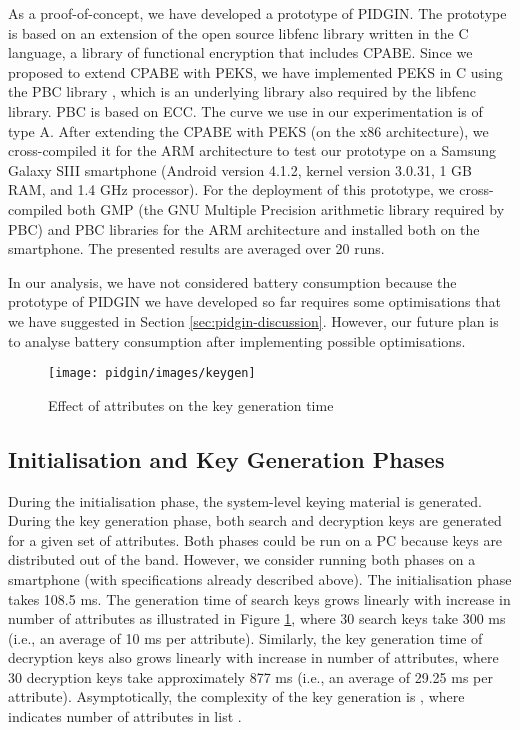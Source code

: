 \documentclass[epsfig,a4paper,11pt,titlepage]{book}
\numberwithin{algorithm}{chapter}
\begin{document}
As a proof-of-concept, we have developed a prototype of \gls{PIDGIN}. The prototype is based on an extension of the open source libfenc library \cite{libfenc} written in the C language, a library of functional encryption that includes \gls{CPABE}. Since we proposed to extend \gls{CPABE} with \gls{PEKS}, we have implemented \gls{PEKS} in C using the \gls{PBC} library \cite{Lynn}, which is an underlying library also required by the libfenc library. \gls{PBC} is based on \gls{ECC}. The curve we use in our experimentation is of type A. After extending the \gls{CPABE} with \gls{PEKS} (on the x86 architecture), we cross-compiled it for the ARM architecture to test our prototype on a Samsung Galaxy SIII smartphone (Android version 4.1.2, kernel version 3.0.31, 1 GB RAM, and 1.4 GHz processor). For the deployment of this prototype, we cross-compiled both GMP \cite{GMP} (the GNU Multiple Precision arithmetic library required by \gls{PBC}) and \gls{PBC} libraries for the ARM architecture and installed both on the smartphone. The presented results are averaged over 20 runs.

In our analysis, we have not considered battery consumption because the prototype of \gls{PIDGIN} we have developed so far requires some optimisations that we have suggested in Section \ref{sec:pidgin-discussion}. However, our future plan is to analyse battery consumption after implementing possible optimisations.

\iffalse
Model number GT-I9300
Android version 4.1.2
Baseband version GT-I9300BUELL1
Kernel version 3.0.31-742798
Build number JZO54K.I9300XXELLA
Processor ARMv7
API level 16
CPU ABI: armeabi-v7a
Processor speed is 1.4 GHz
Frequency stats
Max: 1.4 GHz 1.14\%
Min: 200 MHz 87.39\%
Memory RAM 1 GB
\fi

\begin{figure} [htp]
\centering
\texttt{[image: pidgin/images/keygen]} \caption{Effect of attributes on the key generation time}
\label{gra:keygen}
\end{figure}

\subsection{Initialisation and Key Generation Phases}
During the initialisation phase, the system-level keying material is generated. During the key generation phase, both search and decryption keys are generated for a given set of attributes. Both phases could be run on a PC because keys are distributed out of the band. However, we consider running both phases on a smartphone (with specifications already described above). The initialisation phase takes 108.5 \gls{ms}. The generation time of search keys grows linearly with increase in number of attributes as illustrated in Figure \ref{gra:keygen}, where 30 search keys take 300 \gls{ms} (i.e., an average of 10 \gls{ms} per attribute). Similarly, the key generation time of decryption keys also grows linearly with increase in number of attributes, where 30 decryption keys take approximately 877 \gls{ms} (i.e., an average of 29.25 \gls{ms} per attribute). Asymptotically, the complexity of the key generation is , where  indicates number of attributes in list .
\end{document}
